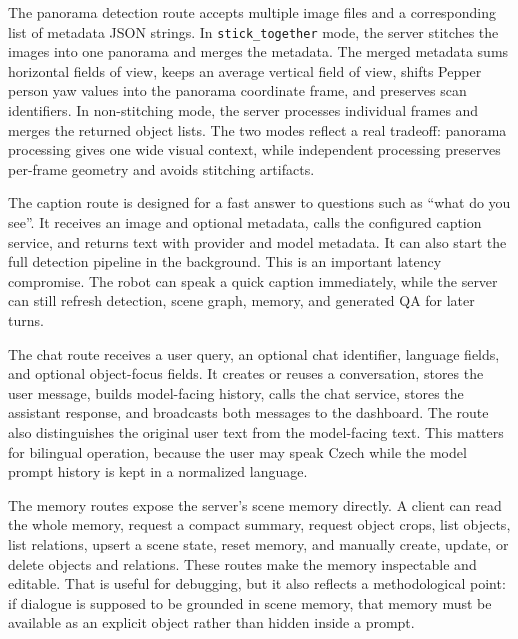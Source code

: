 The panorama detection route accepts multiple image files and a corresponding list of metadata JSON strings. In \texttt{stick\_together} mode, the server stitches the images into one panorama and merges the metadata. The merged metadata sums horizontal fields of view, keeps an average vertical field of view, shifts Pepper person yaw values into the panorama coordinate frame, and preserves scan identifiers. In non-stitching mode, the server processes individual frames and merges the returned object lists. The two modes reflect a real tradeoff: panorama processing gives one wide visual context, while independent processing preserves per-frame geometry and avoids stitching artifacts.

The caption route is designed for a fast answer to questions such as ``what do you see''. It receives an image and optional metadata, calls the configured caption service, and returns text with provider and model metadata. It can also start the full detection pipeline in the background. This is an important latency compromise. The robot can speak a quick caption immediately, while the server can still refresh detection, scene graph, memory, and generated QA for later turns.

The chat route receives a user query, an optional chat identifier, language fields, and optional object-focus fields. It creates or reuses a conversation, stores the user message, builds model-facing history, calls the chat service, stores the assistant response, and broadcasts both messages to the dashboard. The route also distinguishes the original user text from the model-facing text. This matters for bilingual operation, because the user may speak Czech while the model prompt history is kept in a normalized language.

The memory routes expose the server's scene memory directly. A client can read the whole memory, request a compact summary, request object crops, list objects, list relations, upsert a scene state, reset memory, and manually create, update, or delete objects and relations. These routes make the memory inspectable and editable. That is useful for debugging, but it also reflects a methodological point: if dialogue is supposed to be grounded in scene memory, that memory must be available as an explicit object rather than hidden inside a prompt.

